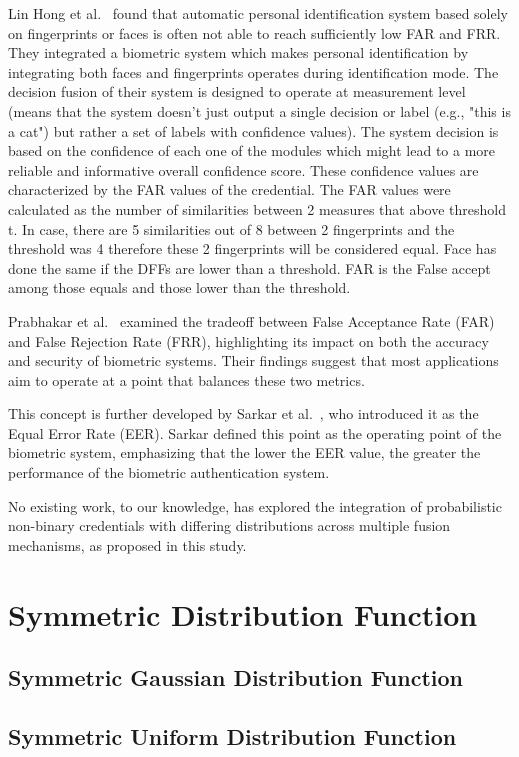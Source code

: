 \documentclass{article}
\begin{document}
Lin Hong et al.~\cite{hong1998} found that automatic personal identification system based solely on fingerprints or faces is often not able to reach sufficiently low FAR and FRR. They integrated a biometric system which makes personal identification by integrating both faces and fingerprints operates during identification mode. The decision fusion of their system is designed to operate at measurement level (means that the system doesn't just output a single decision or label (e.g., "this is a cat") but rather a set of labels with confidence values). The system decision is based on the confidence of each one of the modules which might lead to a more reliable and informative overall confidence score.
These confidence values are characterized by the FAR values of the credential. The FAR values were calculated as the number of similarities between 2 measures that above threshold t. In case, there are 5 similarities out of 8 between 2 fingerprints and the threshold was 4 therefore these 2 fingerprints will be considered equal. Face has done the same if the DFFs are lower than a threshold. FAR is the False accept among those equals and those lower than the threshold.


Prabhakar et al.~\cite{prabhakar2003} examined the tradeoff between False Acceptance Rate (FAR) and False Rejection Rate (FRR), highlighting its impact on both the accuracy and security of biometric systems. Their findings suggest that most applications aim to operate at a point that balances these two metrics.

This concept is further developed by Sarkar et al.~\cite{sarkar2020}, who introduced it as the Equal Error Rate (EER). Sarkar defined this point as the operating point of the biometric system, emphasizing that the lower the EER value, the greater the performance of the biometric authentication system.

No existing work, to our knowledge, has explored the integration of probabilistic non-binary credentials with differing distributions across
multiple fusion mechanisms, as proposed in this study.
\section{Symmetric Distribution Function}
\subsection{Symmetric Gaussian Distribution Function}
\subsection{Symmetric Uniform Distribution Function}
\end{document}
